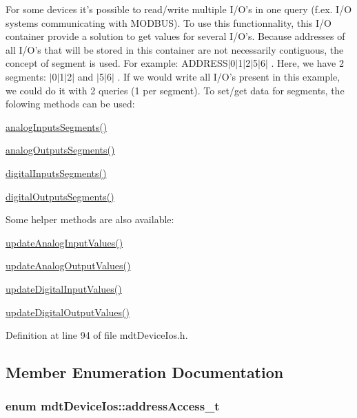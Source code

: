 For some devices it's possible to read/write multiple I/\-O's in one query (f.\-ex. I/\-O systems communicating with M\-O\-D\-B\-U\-S). To use this functionnality, this I/\-O container provide a solution to get values for several I/\-O's. Because addresses of all I/\-O's that will be stored in this container are not necessarily contiguous, the concept of segment is used. For example\-: A\-D\-D\-R\-E\-S\-S$|$0$|$1$|$2$|$5$|$6$|$ . Here, we have 2 segments\-: $|$0$|$1$|$2$|$ and $|$5$|$6$|$ . If we would write all I/\-O's present in this example, we could do it with 2 queries (1 per segment). To set/get data for segments, the folowing methods can be used\-:
\begin{DoxyItemize}
\item \hyperlink{classmdt_device_ios_a71a1b9cdbc524e4d0094ab37575defc1}{analog\-Inputs\-Segments()}
\item \hyperlink{classmdt_device_ios_afc425a36dd8942a507d993993bc141a9}{analog\-Outputs\-Segments()}
\item \hyperlink{classmdt_device_ios_adc81519c2e6edc7fe54663c77d6eb503}{digital\-Inputs\-Segments()}
\item \hyperlink{classmdt_device_ios_ad2b06fe61d71150ac57d77e9bfc7894b}{digital\-Outputs\-Segments()}
\end{DoxyItemize}

Some helper methods are also available\-:
\begin{DoxyItemize}
\item \hyperlink{classmdt_device_ios_addeff0a2dab646a49170f8be10cc46fb}{update\-Analog\-Input\-Values()}
\item \hyperlink{classmdt_device_ios_a3aee92ecadda601d9482aeb6419f0bb8}{update\-Analog\-Output\-Values()}
\item \hyperlink{classmdt_device_ios_ae994a3ef4d4f101ac185308e4afc05cb}{update\-Digital\-Input\-Values()}
\item \hyperlink{classmdt_device_ios_a06642814dbbb525dff7d1a7e603f57ac}{update\-Digital\-Output\-Values()} 
\end{DoxyItemize}

Definition at line 94 of file mdt\-Device\-Ios.\-h.



\subsection{Member Enumeration Documentation}
\hypertarget{classmdt_device_ios_a72fc3fdcd905d669b1e90496e808d6dd}{
\subsubsection[{address\-Access\-\_\-t}]{\setlength{\rightskip}{0pt plus 5cm}enum {\bf mdt\-Device\-Ios\-::address\-Access\-\_\-t}}}\label{classmdt_device_ios_a72fc3fdcd905d669b1e90496e808d6dd}


